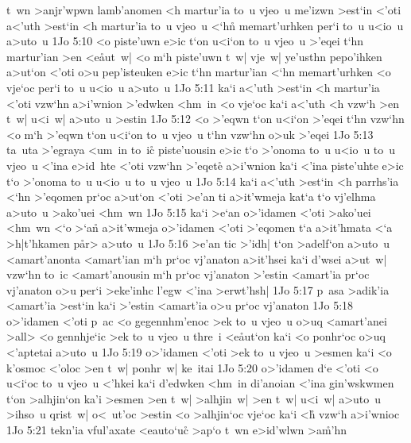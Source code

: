 t~wn
>anjr'wpwn
lamb'anomen
<h
martur'ia
to~u
vjeo~u
me'izwn
>est`in
<'oti
a<'uth
>est`in
<h
martur'ia
to~u
vjeo~u
<`h\r{n}
memart'urhken
per`i
to~u
u<io~u
a>uto~u\bibvsend
\vs 1Jo 5:10
<o
piste'uwn
e>ic
t`on
u<i`on
to~u
vjeo~u
>'eqei
t`hn
martur'ian
>en
<e\r{a}ut~w|
<o
m`h
piste'uwn
t~w|
vje~w|
ye'usthn
pepo'ihken
a>ut`on
<'oti
o>u
pep'isteuken
e>ic
t`hn
martur'ian
<`hn
memart'urhken
<o
vje`oc
per`i
to~u
u<io~u
a>uto~u\bibvsend
\vs 1Jo 5:11
ka`i
a<'uth
>est`in
<h
martur'ia
<'oti
vzw`hn
a>i'wnion
>'edwken
<hm~in
<o
vje`oc
ka`i
a<'uth
<h
vzw`h
>en
t~w|
u<i~w|
a>uto~u
>estin\bibvsend
\vs 1Jo 5:12
<o
>'eqwn
t`on
u<i`on
>'eqei
t`hn
vzw`hn
<o
m`h
>'eqwn
t`on
u<i`on
to~u
vjeo~u
t`hn
vzw`hn
o>uk
>'eqei\bibvsend
\vs 1Jo 5:13
ta~uta
>'egraya
<um~in
to~ic\r{}
piste'uousin
e>ic
t`o
>'onoma
to~u
u<io~u
to~u
vjeo~u
<'ina
e>id~hte
<'oti
vzw`hn
>'eqete\r{}
a>i'wnion
ka`i
<'ina
piste'uhte
e>ic
t`o
>'onoma
to~u
u<io~u
to~u
vjeo~u\bibvsend
\vs 1Jo 5:14
ka`i
a<'uth
>est`in
<h
parrhs'ia
<`hn
>'eqomen
pr`oc
a>ut`on
<'oti
>e'an
ti
a>it'wmeja
kat`a
t`o
vj'elhma
a>uto~u
>ako'uei
<hm~wn\bibvsend
\vs 1Jo 5:15
ka`i
>e`an
o>'idamen
<'oti
>ako'uei
<hm~wn
<`o
>`a\r{n}
a>it'wmeja
o>'idamen
<'oti
>'eqomen
t`a
a>it'hmata
<`a
>h|t'hkamen
p\r{a}r>
a>uto~u\bibvsend
\vs 1Jo 5:16
>e'an
tic
>'idh|
t`on
>adelf`on
a>uto~u
<amart'anonta
<amart'ian
m`h
pr`oc
vj'anaton
a>it'hsei
ka`i
d'wsei
a>ut~w|
vzw`hn
to~ic
<amart'anousin
m`h
pr`oc
vj'anaton
>'estin
<amart'ia
pr`oc
vj'anaton
o>u
per`i
>eke'inhc
l'egw
<'ina
>erwt'hsh|\bibvsend
\vs 1Jo 5:17
p~asa
>adik'ia
<amart'ia
>est`in
ka`i
>'estin
<amart'ia
o>u
pr`oc
vj'anaton\bibvsend
\vs 1Jo 5:18
o>'idamen
<'oti
p~ac
<o
gegennhm'enoc
>ek
to~u
vjeo~u
o>uq
<amart'anei
>all>
<o
gennhje`ic
>ek
to~u
vjeo~u
thre~i
<e\r{a}ut`on
ka`i
<o
ponhr`oc
o>uq
<'aptetai
a>uto~u\bibvsend
\vs 1Jo 5:19
o>'idamen
<'oti
>ek
to~u
vjeo~u
>esmen
ka`i
<o
k'osmoc
<'oloc
>en
t~w|
ponhr~w|
ke~itai\bibvsend
\vs 1Jo 5:20
o>'idamen
d`e
<'oti
<o
u<i`oc
to~u
vjeo~u
<'hkei
ka`i
d'edwken
<hm~in
di'anoian
<'ina
gin'wskwmen
t`on
>alhjin`on
ka'i
>esmen
>en
t~w|
>alhjin~w|
>en
t~w|
u<i~w|
a>uto~u
>ihso~u
qrist~w|
o<~ut'oc
>estin
<o
>alhjin`oc
vje`oc
ka`i
<h\r{}
vzw`h
a>i'wnioc\bibvsend
\vs 1Jo 5:21
tekn'ia
vful'axate
<eauto`u\r{c}
>ap`o
t~wn
e>id'wlwn
>a\r{m}'hn\bibvsend
{}
